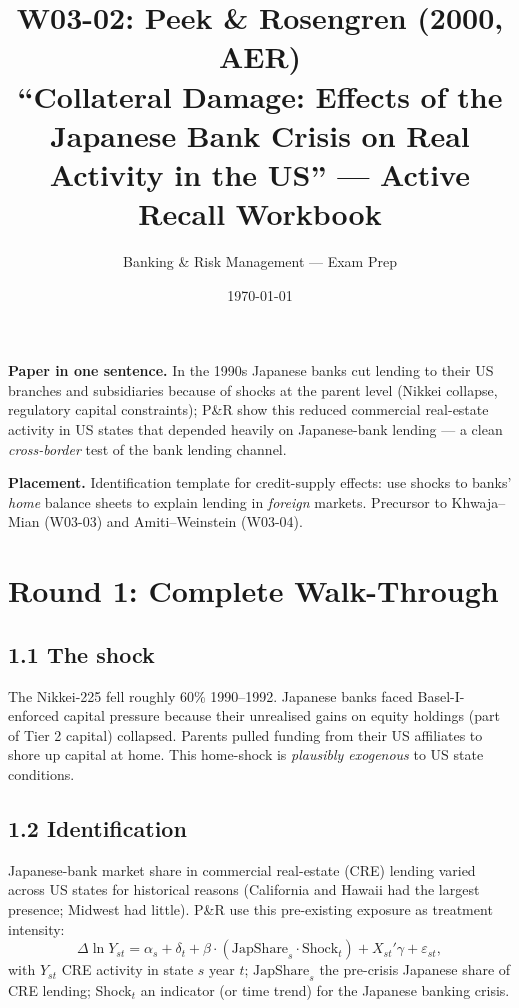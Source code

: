 \documentclass[11pt]{article}
\title{W03-02: Peek \& Rosengren (2000, AER) \\
\large ``Collateral Damage: Effects of the Japanese Bank Crisis on Real Activity in the US'' --- Active Recall Workbook}
\author{Banking \& Risk Management --- Exam Prep}
\date{\today}
\begin{document}
\maketitle

\begin{keybox}
\textbf{Paper in one sentence.} In the 1990s Japanese banks cut lending to their US branches and subsidiaries because of shocks at the parent level (Nikkei collapse, regulatory capital constraints); P\&R show this reduced commercial real-estate activity in US states that depended heavily on Japanese-bank lending --- a clean \emph{cross-border} test of the bank lending channel.

\textbf{Placement.} Identification template for credit-supply effects: use shocks to banks' \emph{home} balance sheets to explain lending in \emph{foreign} markets. Precursor to Khwaja--Mian (W03-03) and Amiti--Weinstein (W03-04).
\end{keybox}

\section*{Round 1: Complete Walk-Through}

\subsection*{1.1 The shock}
The Nikkei-225 fell roughly 60\% 1990--1992. Japanese banks faced Basel-I-enforced capital pressure because their unrealised gains on equity holdings (part of Tier 2 capital) collapsed. Parents pulled funding from their US affiliates to shore up capital at home. This home-shock is \emph{plausibly exogenous} to US state conditions.

\subsection*{1.2 Identification}
Japanese-bank market share in commercial real-estate (CRE) lending varied across US states for historical reasons (California and Hawaii had the largest presence; Midwest had little). P\&R use this pre-existing exposure as treatment intensity:
\[
\Delta\ln Y_{st}=\alpha_s+\delta_t+\beta\cdot (\text{JapShare}_s\cdot \text{Shock}_t)+X_{st}'\gamma+\varepsilon_{st},
\]
with $Y_{st}$ CRE activity in state $s$ year $t$; $\text{JapShare}_s$ the pre-crisis Japanese share of CRE lending; Shock$_t$ an indicator (or time trend) for the Japanese banking crisis.
\end{document}
